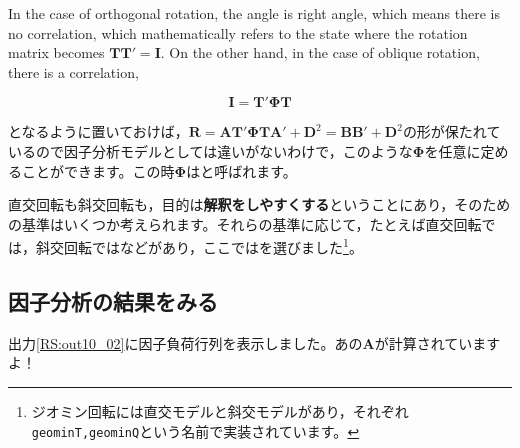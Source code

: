 \documentclass{ltjsbook}
\begin{document}
In the case of orthogonal rotation, the angle is right angle, which means there is no correlation, which mathematically refers to the state where the rotation matrix becomes $\bm{TT'}=\bm{I}$. On the other hand, in the case of oblique rotation, there is a correlation,

\[ \bm{I} = \bm{T'\Phi T}\]

となるように置いておけば，$\bm{R} = \bm{AT'\Phi TA'}+\bm{D}^2=\bm{BB'}+\bm{D}^2$の形が保たれているので因子分析モデルとしては違いがないわけで，このような$\bm{\Phi}$を任意に定めることができます。この時$\bm{\Phi}$はと呼ばれます。

直交回転も斜交回転も，目的は\textbf{解釈をしやすくする}ということにあり，そのための基準はいくつか考えられます。それらの基準に応じて，たとえば直交回転では，斜交回転ではなどがあり，ここではを選びました\footnote{ジオミン回転には直交モデルと斜交モデルがあり，それぞれ\verb|geominT,geominQ|という名前で実装されています。}。

\subsection{因子分析の結果をみる}
出力\ref{RS:out10_02}に因子負荷行列を表示しました。あの$\bm{A}$が計算されていますよ！
\end{document}
